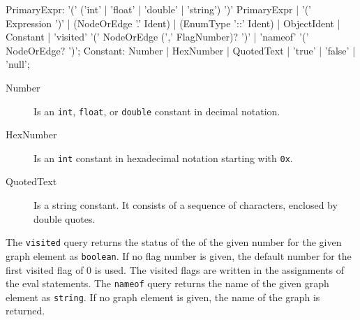 \begin{rail} 
  PrimaryExpr: '(' ('int' | 'float' | 'double' | 'string') ')' PrimaryExpr | '(' Expression ')' | (NodeOrEdge '.' Ident) | (EnumType '::' Ident) | ObjectIdent | Constant | 'visited' '(' NodeOrEdge (',' FlagNumber)? ')' | 'nameof' '(' NodeOrEdge? ')';
  Constant: Number | HexNumber | QuotedText | 'true' | 'false' | 'null';
\end{rail}
\begin{description}
  \item[Number] Is an \texttt{int}, \texttt{float}, or \texttt{double} constant in decimal notation.
  \item[HexNumber] Is an \texttt{int} constant in hexadecimal notation starting with \texttt{0x}.
  \item[QuotedText] Is a string constant. It consists of a sequence of characters, enclosed by double quotes.
\end{description}

The \texttt{visited} query returns the status of the  of the given number for the given graph element as \texttt{boolean}.
If no flag number is given, the default number for the first visited flag of 0 is used. The visited flags are written in the assignments of the eval statements.
The \texttt{nameof} query returns the name of the given graph element as \texttt{string}. If no graph element is given, the name of the graph is returned.
